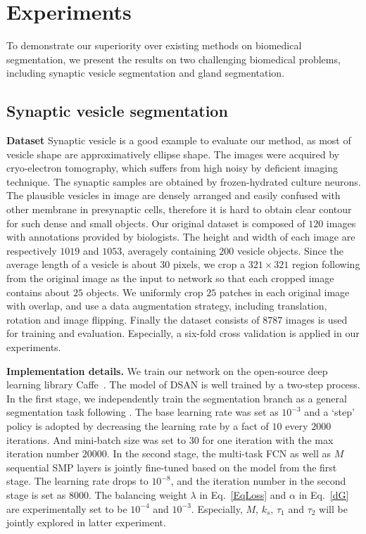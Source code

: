 \section{Experiments}
\label{sec:results}
To demonstrate our superiority over existing methods on biomedical segmentation, we present the results on two challenging biomedical problems, including synaptic vesicle segmentation and gland segmentation.

\subsection{Synaptic vesicle segmentation}
\noindent\textbf{Dataset}
Synaptic vesicle is a good example to evaluate our method, as most of vesicle shape are approximatively ellipse shape.
The images were acquired by cryo-electron tomography, which suffers from high noisy by deficient imaging technique.
The synaptic samples are obtained by frozen-hydrated culture neurons.
The plausible vesicles in image are densely arranged and easily confused with other membrane in presynaptic cells, therefore it is hard to obtain clear contour for such dense and small objects.
Our original dataset is composed of $120$ images with annotations provided by biologists.
The height and width of each image are respectively $1019$ and $1053$, averagely containing $200$ vesicle objects.
Since the average length of a vesicle is about $30$ pixels, we crop a $321\times 321$ region following \cite{Chen2014a} from the original image as the input to network so that each cropped image contains about $25$ objects.
We uniformly crop $25$ patches in each original image with overlap, and use a data augmentation strategy, including translation, rotation and image flipping.
Finally the dataset consists of $8787$ images is used for training and evaluation.
Especially, a six-fold cross validation is applied in our experiments.

\noindent\textbf{Implementation details.}
We train our network on the open-source deep learning library Caffe~\cite{Jia2014}.
The model of DSAN is well trained by a two-step process.
In the first stage, we independently train the segmentation branch as a general segmentation task following \cite{Chen2014a}.
The base learning rate was set as $10^{-3}$ and a `step' policy is adopted by decreasing the learning rate by a fact of $10$ every $2000$ iterations.
And mini-batch size was set to $30$ for one iteration with the max iteration number $20000$.
In the second stage, the multi-task FCN as well as $M$ sequential SMP layers is jointly fine-tuned based on the model from the first stage.
The learning rate drops to $10^{-8}$, and the iteration number in the second stage is set as $8000$.
The balancing weight $\lambda$ in Eq.~\ref{EqLoss} and $\alpha$ in Eq.~\ref{dG} are experimentally set to be $10^{-4}$ and $10^{-3}$.
Especially, $M$, $k_s$, $\tau_1$ and $\tau_2$ will be jointly explored in latter experiment.

